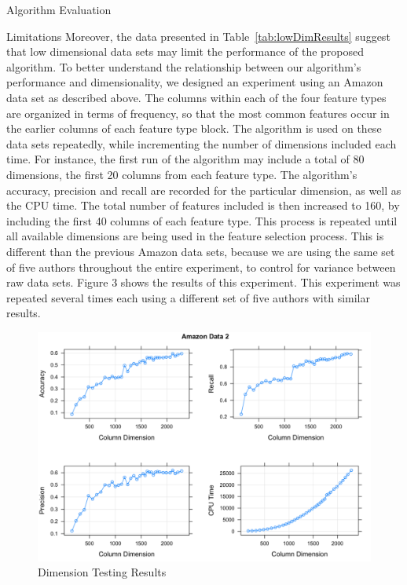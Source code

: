 \documentclass{llncs}
\begin{document}
\begin{section}{Algorithm Evaluation}
\begin{subsection}{Limitations}
Moreover, the data presented in Table~\ref{tab:lowDimResults} suggest that low dimensional data sets may limit the performance of the proposed algorithm. To better understand the relationship between our algorithm's performance and dimensionality, we designed an experiment using an Amazon data set as described above. The columns within each of the four feature types are organized in terms of frequency, so that the most common features occur in the earlier columns of each feature type block. The algorithm is used on these data sets repeatedly, while incrementing the number of dimensions included each time. For instance, the first run of the algorithm may include a total of 80 dimensions, the first 20 columns from each feature type. The algorithm's accuracy, precision and recall are recorded for the particular dimension, as well as the CPU time. The total number of features included is then increased to 160, by including the first 40 columns of each feature type. This process is repeated until all available dimensions are being used in the feature selection process. This is different than the previous Amazon data sets, because we are using the same set of five authors throughout the entire experiment, to control for variance between raw data sets. Figure 3 shows the results of this experiment. This experiment was repeated several times each using a different set of five authors with similar results.
\begin{figure}[h]
\begin{center}
\includegraphics[scale = .3]{figures/amazon2}
\caption{Dimension Testing Results}
\end{center}
\label{fig:dimtests}
\end{figure}


\end{subsection}
\end{section}
\end{document}

